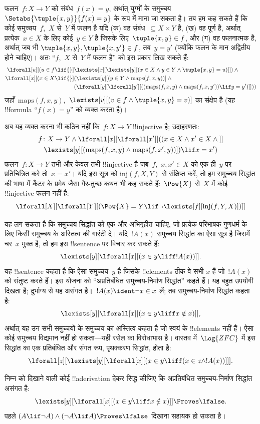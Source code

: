 \documentclass[../../../include/open-logic-section]{subfiles}
\begin{document}
फलन~$f \colon X \to Y$ को संबंध~$f(x)
= y$, अर्थात् युग्मों के समुच्चय
$\Setabs{\tuple{x,y}}{f(x) = y}$ के रूप में माना जा सकता है। तब हम कह सकते
हैं कि कोई समुच्चय~$f$,~$X$ से~$Y$ में फलन है यदि (क) वह संबंध~$\subseteq X \times Y$
है, (ख) वह पूर्ण है, अर्थात् प्रत्येक~$x
\in X$ के लिए कोई~$y \in Y$ है जिसके लिए~$\tuple{x, y} \in f$, और (ग) वह फलनात्मक है, अर्थात् जब भी
$\tuple{x, y}, \tuple{x, y'} \in f$, तब~$y = y'$ (क्योंकि फलन के मान
अद्वितीय होने चाहिए)। अतः ``$f$,~$X$ से~$Y$ में फलन है'' को इस प्रकार लिख
सकते हैं:
\begin{align*}
 \lforall[u][(u \in f \lif {}] & \lexists[x][\lexists[y][(x \in X \land y \in
      Y \land \tuple{x, y} = u)]]) \land {}\\
 \lforall[x][(x \in X \lif {}] &
      (\lexists[y][(y \in Y \land \mathrm{maps}(f, x, y))] \land {}\\
& (\lforall[y][\lforall[y'][((\mathrm{maps}(f, x, y) \land
    \mathrm{maps}(f, x, y')) \lif y = y')]]))
\end{align*}
जहाँ~$\mathrm{maps}(f, x, y)$,~$\lexists[v][(v \in f \land
  \tuple{x, y} = v)]$ का संक्षेप है (यह !!{formula} ``$f(x) = y$'' को व्यक्त करता है)।

अब यह व्यक्त करना भी कठिन नहीं कि~$f\colon X \to Y$ !!{injective} है; उदाहरणतः:
\begin{multline*}
 f \colon X \to Y \land \lforall[x][\lforall[x'][((x \in X \land x' \in
     X \land {}]] \\
 \lexists[y][(\mathrm{maps}(f, x, y) \land \mathrm{maps}(f,
        x', y))]) \lif x = x')
\end{multline*}
फलन~$f\colon X \to Y$ तभी और केवल तभी !!{injective} है जब~$f$,~$x, x'
\in X$ को एक ही~$y$ पर प्रतिचित्रित करे तो~$x = x'$। यदि इस सूत्र को
$\mathrm{inj}(f, X, Y)$ से संक्षिप्त करें, तो हम समुच्चय सिद्धांत की भाषा में
कैंटर के प्रमेय जैसा गैर-तुच्छ कथन भी कह सकते हैं:~$\Pow{X}$ से~$X$ में कोई
!!{injective} फलन नहीं है:
\[
\lforall[X][\lforall[Y][(\Pow{X} = Y \lif
    \lnot\lexists[f][\mathrm{inj}(f, Y, X)])]]
\]

यह लग सकता है कि समुच्चय सिद्धांत को एक और अभिगृहीत चाहिए, जो प्रत्येक
परिभाषक गुणधर्म के लिए किसी समुच्चय के अस्तित्व की गारंटी दे। यदि~$!A(x)$
समुच्चय सिद्धांत का ऐसा सूत्र है जिसमें चर~$x$ मुक्त है, तो हम इस !!{sentence}
पर विचार कर सकते हैं:
\[
\lexists[y][\lforall[x][(x \in y \liff !A(x))]].
\]
यह !!{sentence} कहता है कि ऐसा समुच्चय~$y$ है जिसके !!{element}s ठीक वे सभी
$x$ हैं जो~$!A(x)$ को संतुष्ट करते हैं। इस योजना को ``अप्रतिबंधित
समुच्चय-निर्माण सिद्धांत'' कहते हैं। यह बहुत उपयोगी दिखता है; दुर्भाग्य से यह
असंगत है।~$!A(x) \ident \lnot x \in x$ लें; तब समुच्चय-निर्माण सिद्धांत
कहता है:
\[
\lexists[y][\lforall[x][(x \in y \liff x \notin x)]],
\]
अर्थात् यह उन सभी समुच्चयों के समुच्चय का अस्तित्व कहता है जो स्वयं के
!!{element}s नहीं हैं। ऐसा कोई समुच्चय विद्यमान नहीं हो सकता---यही रसेल का
विरोधाभास है। वास्तव में~$\Log{ZFC}$ में इस सिद्धांत का एक प्रतिबंधित और
संगत रूप, पृथक्करण सिद्धांत, होता है:
\[
\lforall[z][\lexists[y][\lforall[x][(x \in y \liff (x \in z \land
      !A(x))]]].
\]

\begin{prob}
निम्न को दिखाने वाली कोई !!a{derivation} देकर सिद्ध कीजिए कि अप्रतिबंधित
समुच्चय-निर्माण सिद्धांत असंगत है:
\[
\lexists[y][\lforall[x][(x \in y \liff x \notin x)]] \Proves \lfalse.
\]
पहले $(A \lif \lnot A) \land (\lnot A \lif A)
\Proves \lfalse$ दिखाना
सहायक हो सकता है।
\end{prob}
\end{document}
